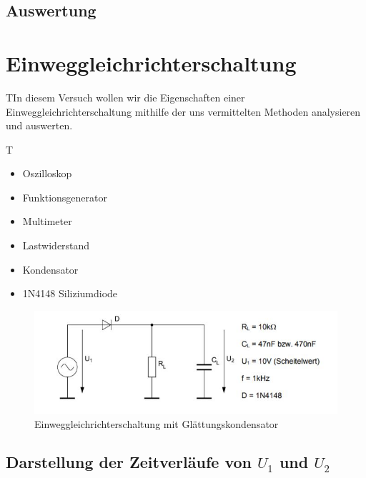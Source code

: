 \documentclass{article}
\begin{document}
\subsection{Auswertung}

\section{Einweggleichrichterschaltung}
\begin{task}
  TIn diesem Versuch wollen wir die Eigenschaften einer Einweggleichrichterschaltung mithilfe der uns 
  vermittelten Methoden analysieren und auswerten.
\end{task}

\begin{devlist}
  T\begin{itemize}
    \item Oszilloskop
    \item Funktionsgenerator
    \item Multimeter
    \item Lastwiderstand
    \item Kondensator
    \item 1N4148 Siliziumdiode
  \end{itemize}
\end{devlist}

\begin{figure}[h]
  \begin{center}
    \includegraphics{../assets/images/EL1P2/aufgabe 3 schaltung.JPG}
    \caption{Einweggleichrichterschaltung mit Glättungskondensator}
  \end{center}
\end{figure}

\subsection{Darstellung der Zeitverläufe von $U_1$ und $U_2$}
\end{document}

